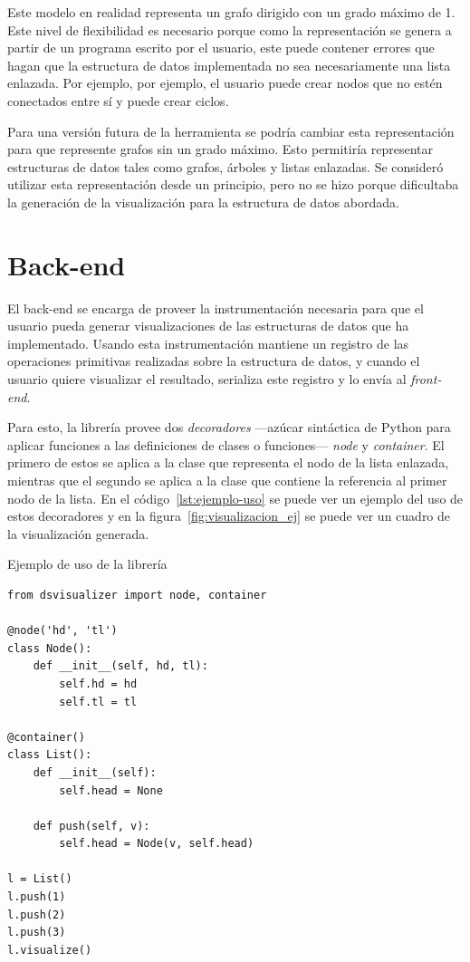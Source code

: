Este modelo en realidad representa un grafo dirigido con un grado máximo de 1. Este nivel de flexibilidad es necesario porque como la representación se genera a partir de un programa escrito por el usuario, este puede contener errores que hagan que la estructura de datos implementada no sea necesariamente una lista enlazada. Por ejemplo, por ejemplo, el usuario puede crear nodos que no estén conectados entre sí y puede crear ciclos.

Para una versión futura de la herramienta se podría cambiar esta representación para que represente grafos sin un grado máximo. Esto permitiría representar estructuras de datos tales como grafos, árboles y listas enlazadas. Se consideró utilizar esta representación desde un principio, pero no se hizo porque dificultaba la generación de la visualización para la estructura de datos abordada.

\section{Back-end}

El back-end se encarga de proveer la instrumentación necesaria para que el usuario pueda generar visualizaciones de las estructuras de datos que ha implementado. Usando esta instrumentación mantiene un registro de las operaciones primitivas realizadas sobre la estructura de datos, y cuando el usuario quiere visualizar el resultado, serializa este registro y lo envía al \textit{front-end}.

Para esto, la librería provee dos \textit{decoradores} ---azúcar sintáctica de Python para aplicar funciones a las definiciones de clases o funciones--- \textit{node} y \textit{container}. El primero de estos se aplica a la clase que representa el nodo de la lista enlazada, mientras que el segundo se aplica a la clase que contiene la referencia al primer nodo de la lista. En el código~\ref{lst:ejemplo-uso} se puede ver un ejemplo del uso de estos decoradores y en la figura~\ref{fig:visualizacion_ej} se puede ver un cuadro de la visualización generada.

\begin{listing}[h]
\caption{Ejemplo de uso de la librería}
\label{lst:ejemplo-uso}
\begin{verbatim}
from dsvisualizer import node, container

@node('hd', 'tl')
class Node():
    def __init__(self, hd, tl):
        self.hd = hd
        self.tl = tl

@container()
class List():
    def __init__(self):
        self.head = None

    def push(self, v):
        self.head = Node(v, self.head)

l = List()
l.push(1)
l.push(2)
l.push(3)
l.visualize()
\end{verbatim}
\end{listing}

